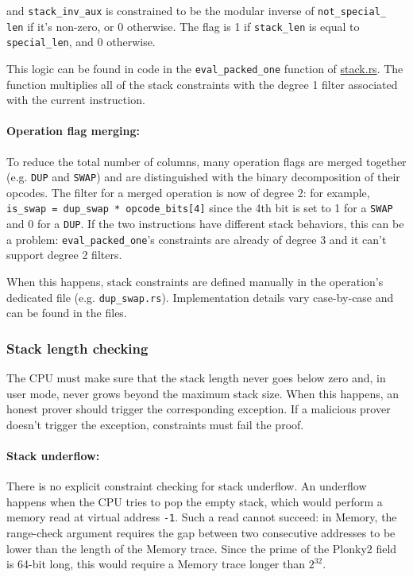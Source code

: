 and \texttt{stack\_inv\_aux} is constrained to be the modular inverse of \texttt{not\_special\_ len} if it's non-zero, or 0 otherwise. The flag is 1
if \texttt{stack\_len} is equal to \texttt{special\_len}, and 0 otherwise.

This logic can be found in code in the \texttt{eval\_packed\_one} function of \href{https://github.com/0xPolygonZero/plonky2/blob/main/evm/src/cpu/stack.rs}{stack.rs}.
The function multiplies all of the stack constraints with the degree 1 filter associated with the current instruction.

\paragraph*{Operation flag merging:}

To reduce the total number of columns, many operation flags are merged together (e.g. \texttt{DUP} and \texttt{SWAP}) and are distinguished with the binary decomposition of their opcodes.
The filter for a merged operation is now of degree 2: for example, \texttt{is\_swap = dup\_swap * opcode\_bits[4]} since the 4th bit is set to 1 for a \texttt{SWAP} and 0 for a \texttt{DUP}.
If the two instructions have different stack behaviors, this can be a problem: \texttt{eval\_packed\_one}'s constraints are already of degree 3 and it can't support degree 2 filters.

When this happens, stack constraints are defined manually in the operation's dedicated file (e.g. \texttt{dup\_swap.rs}). Implementation details vary case-by-case and can be found in the files.

\subsubsection{Stack length checking}

The CPU must make sure that the stack length never goes below zero and, in user mode, never grows beyond the maximum stack size. When this happens, an honest prover should trigger the
corresponding exception. If a malicious prover doesn't trigger the exception, constraints must fail the proof.

\paragraph*{Stack underflow:}
There is no explicit constraint checking for stack underflow. An underflow happens when the CPU tries to pop the empty stack, which would perform a memory read at virtual address \texttt{-1}.
Such a read cannot succeed: in Memory, the range-check argument requires the gap between two consecutive addresses to be lower than the length of the Memory trace. Since the prime of the Plonky2 field is 64-bit long,
this would require a Memory trace longer than $2^{32}$.

